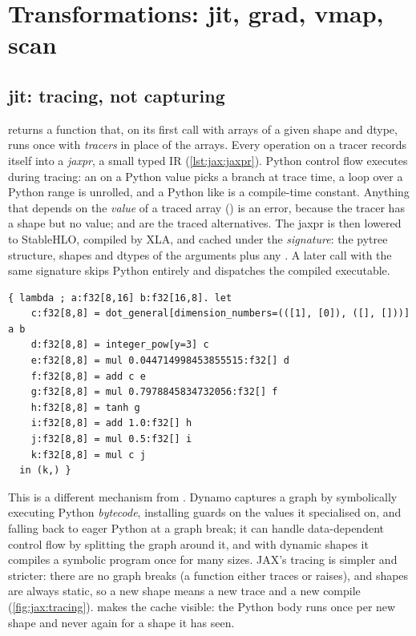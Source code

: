 \section{Transformations: jit, grad, vmap, scan}\label{sec:jax:transforms}

\subsection{jit: tracing, not capturing}
 returns a function that, on its first call with arrays of a given shape and
dtype, runs  once with \emph{tracers} in place of the arrays. Every 
operation on a tracer records itself into a \emph{jaxpr}, a small typed IR
(\cref{lst:jax:jaxpr}). Python control flow executes during tracing: an  on a
Python value picks a branch at trace time, a  loop over a Python range is unrolled,
and a Python  like  is a compile-time constant. Anything that depends
on the \emph{value} of a traced array () is an error, because the
tracer has a shape but no value;  and  are the
traced alternatives. The jaxpr is then lowered to StableHLO, compiled by XLA, and cached
under the \emph{signature}: the pytree structure, shapes and dtypes of the arguments plus any
. A later call with the same signature skips Python entirely and
dispatches the compiled executable.

\begin{lstlisting}[style=plain,caption={The jaxpr of \code{jax.nn.gelu(x @ w)} for $x\in\R^{8\times16}$, $w\in\R^{16\times8}$ (\code{jax.make\_jaxpr}). Each line is one primitive with typed inputs and outputs.},label={lst:jax:jaxpr}]
{ lambda ; a:f32[8,16] b:f32[16,8]. let
    c:f32[8,8] = dot_general[dimension_numbers=(([1], [0]), ([], []))] a b
    d:f32[8,8] = integer_pow[y=3] c
    e:f32[8,8] = mul 0.044714998453855515:f32[] d
    f:f32[8,8] = add c e
    g:f32[8,8] = mul 0.7978845834732056:f32[] f
    h:f32[8,8] = tanh g
    i:f32[8,8] = add 1.0:f32[] h
    j:f32[8,8] = mul 0.5:f32[] i
    k:f32[8,8] = mul c j
  in (k,) }
\end{lstlisting}

This is a different mechanism from . Dynamo captures a graph by
symbolically executing Python \emph{bytecode}, installing guards on the values it specialised
on, and falling back to eager Python at a graph break; it can handle data-dependent control
flow by splitting the graph around it, and with dynamic shapes it compiles a symbolic program
once for many sizes. JAX's tracing is simpler and stricter: there are no graph breaks (a
function either traces or raises), and shapes are always static, so a new shape means a new
trace and a new compile (\cref{fig:jax:tracing}).  makes the cache
visible: the Python body runs once per new shape and never again for a shape it has seen.

